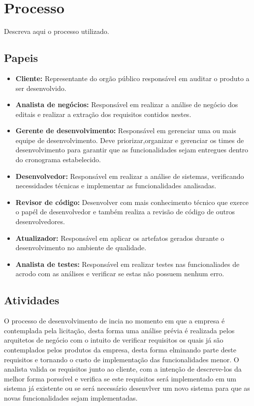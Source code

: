 \documentclass[	DIV=calc,%
							paper=a4,%
							fontsize=12pt,%
							onecolumn]{scrartcl}	 					%
\begin{document}
\section{Processo}
Descreva aqui o processo utilizado.

\subsection{Papeis}
\begin{itemize}
	\item \textbf{Cliente:} Representante do orgão público responsável em auditar o produto a ser desenvolvido.
	\item \textbf{Analista de negócios:} Responsável em realizar a análise de negócio dos editais e realizar a extração dos requisitos contidos nestes. 
	\item \textbf{Gerente de desenvolvimento:} Responsável em gerenciar uma ou mais equipe de desenvolvimento. Deve priorizar,organizar e gerenciar 
	os times de desenvolvimento para garantir que as funcionalidades sejam entregues dentro do cronograma estabelecido.
	\item \textbf{Desenvolvedor:} Responsável em realizar a análise de sistemas, verificando necessidades técnicas e implementar as funcionalidades analisadas.
	\item \textbf{Revisor de código:} Desenvolver com mais conhecimento técnico que exerce o papél de desenvolvedor e também realiza 
	a revisão de código de outros desenvolvedores.
	\item \textbf{Atualizador:} Responsável em aplicar os artefatos gerados durante o desenvolvimento no ambiente de qualidade.
	\item \textbf{Analista de testes:} Responsável em realizar testes nas funcionaliades de acrodo com as análises e verificar se estas não possuem nenhum erro.
\end{itemize}

\subsection{Atividades}

O processo de desenvolvimento de incia no momento em que a empresa é contemplada pela licitação, desta forma uma análise prévia é realizada pelos arquitetos
de negócio com o intuito de verificar requisitos os quais já são contemplados pelos produtos da empresa, desta forma elminando parte deste requisitos e tornando o
custo de implementação das funcionalidades menor. O analista valida os requisitos junto ao cliente, com a intenção de descreve-los da melhor forma porssível e verifica
se este requisitos será implementado em um sistema já existente ou se será necessário desenvlver um novo sistema para que as novas funcionalidades sejam implementadas.
\end{document}
